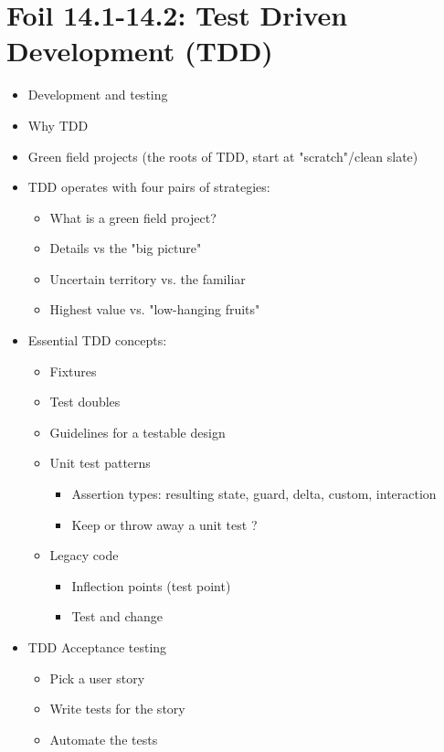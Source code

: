 

	\section{Foil 14.1-14.2: Test Driven Development (TDD)}
		\begin{itemize}
				\item Development and testing
				\item Why TDD
				\item Green field projects (the roots of TDD, start at "scratch"/clean slate)
				\item TDD operates with four pairs of strategies:
					\begin{itemize}
						\item What is a green field project?
						\item Details vs the "big picture"
						\item Uncertain territory vs. the familiar
						\item Highest value vs. "low-hanging fruits"
					\end{itemize}
				\item Essential TDD concepts:
					\begin{itemize}
						\item Fixtures
						\item Test doubles
						\item Guidelines for a testable design
						\item Unit test patterns 
							\begin{itemize}
								\item Assertion types: resulting state, guard, delta, custom, interaction
								\item Keep or throw away a unit test ?
							\end{itemize}
						\item Legacy code 
							\begin{itemize}
								\item Inflection points (test point)
								\item Test and change
							\end{itemize}
					\end{itemize}
				\item TDD Acceptance testing
					\begin{itemize}
						\item Pick a user story
						\item Write tests for the story
						\item Automate the tests
					\end{itemize}
			\end{itemize}
	
